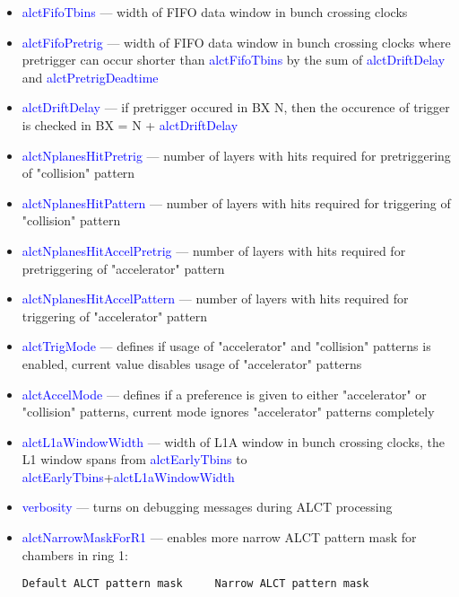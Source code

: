 \begin{itemize}
	\item \textcolor{blue}{alctFifoTbins} --- width of FIFO data window in bunch crossing clocks
	\item \textcolor{blue}{alctFifoPretrig} --- width of FIFO data window in bunch crossing clocks where pretrigger can occur
	shorter than \textcolor{blue}{alctFifoTbins} by the sum of \textcolor{blue}{alctDriftDelay} and  \textcolor{blue}{alctPretrigDeadtime}
	\item \textcolor{blue}{alctDriftDelay} --- if pretrigger occured in BX N, then the occurence of trigger is checked in BX = N + \textcolor{blue}{alctDriftDelay}
	\item \textcolor{blue}{alctNplanesHitPretrig} --- number of layers with hits required for pretriggering of "collision" pattern
	\item \textcolor{blue}{alctNplanesHitPattern} --- number of layers with hits required for triggering of "collision" pattern
	\item \textcolor{blue}{alctNplanesHitAccelPretrig} --- number of layers with hits required for pretriggering of "accelerator" pattern
	\item \textcolor{blue}{alctNplanesHitAccelPattern} --- number of layers with hits required for triggering of "accelerator" pattern
	\item \textcolor{blue}{alctTrigMode} --- defines if usage of "accelerator" and "collision" patterns is enabled, current value disables usage of "accelerator" patterns
	\item \textcolor{blue}{alctAccelMode} --- defines if a preference is given to either "accelerator" or "collision" patterns, current mode ignores "accelerator" patterns completely
	\item \textcolor{blue}{alctL1aWindowWidth} --- width of L1A window in bunch crossing clocks, the L1 window spans 
	from \textcolor{blue}{alctEarlyTbins} to \textcolor{blue}{alctEarlyTbins}+\textcolor{blue}{alctL1aWindowWidth}
	\item \textcolor{blue}{verbosity} --- turns on debugging messages during ALCT processing
	\item \textcolor{blue}{alctNarrowMaskForR1} --- enables more narrow ALCT pattern mask for chambers in ring 1:
	\newpage

\begin{verbatim}
Default ALCT pattern mask     Narrow ALCT pattern mask


\end{verbatim}
\end{itemize}
